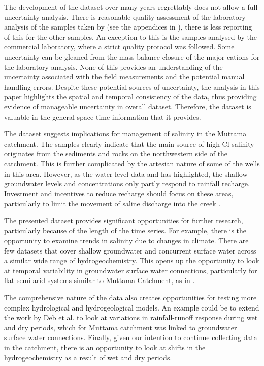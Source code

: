\documentclass[, manuscript]{copernicus}
\begin{document}
The development of the dataset over many years regrettably does not
allow a full uncertainty analysis. There is reasonable quality
assessment of the laboratory analysis of the samples taken by
\citet{Akter2018} (see the appendices in \citet{Akter2018}), there is
less reporting of this for the other samples. An exception to this is
the samples analysed by the commercial laboratory, where a strict
quality protocol was followed. Some uncertainty can be gleaned from the
mass balance closure of the major cations for the laboratory analysis.
None of this provides an understanding of the uncertainty associated
with the field measurements and the potential manual handling errors.
Despite these potential sources of uncertainty, the analysis in this
paper highlights the spatial and temporal consistency of the data, thus
providing evidence of manageable uncertainty in overall dataset.
Therefore, the dataset is valuable in the general space time information
that it provides.

The dataset suggests implications for management of salinity in the
Muttama catchment. The samples clearly indicate that the main source of
high Cl salinity originates from the sediments and rocks on the
northwestern side of the catchment. This is further complicated by the
artesian nature of some of the wells in this area. However, as the water
level data and \citet{Akter2021} has highlighted, the shallow
groundwater levels and concentrations only partly respond to rainfall
recharge. Investment and incentives to reduce recharge should focus on
these areas, particularly to limit the movement of saline discharge into
the creek \citep{Akter2018}.

The presented dataset provides significant opportunities for further
research, particularly because of the length of the time series. For
example, there is the opportunity to examine trends in salinity due to
changes in climate. There are few datasets that cover shallow
groundwater and concurrent surface water across a similar wide range of
hydrogeochemistry. This opens up the opportunity to look at temporal
variability in groundwater surface water connections, particularly for
flat semi-arid systems similar to Muttama Catchment, as in
\citet{Akter2018}.

The comprehensive nature of the data also creates opportunities for
testing more complex hydrological and hydrogeological models. An example
could be to extend the work by Deb et al.
\citeyearpar{debMuttamamodel2019} to look at variations in
rainfall-runoff response during wet and dry periods, which for Muttama
catchment was linked to groundwater surface water connections. Finally,
given our intention to continue collecting data in the catchment, there
is an opportunity to look at shifts in the hydrogeochemistry as a result
of wet and dry periods.
\end{document}
